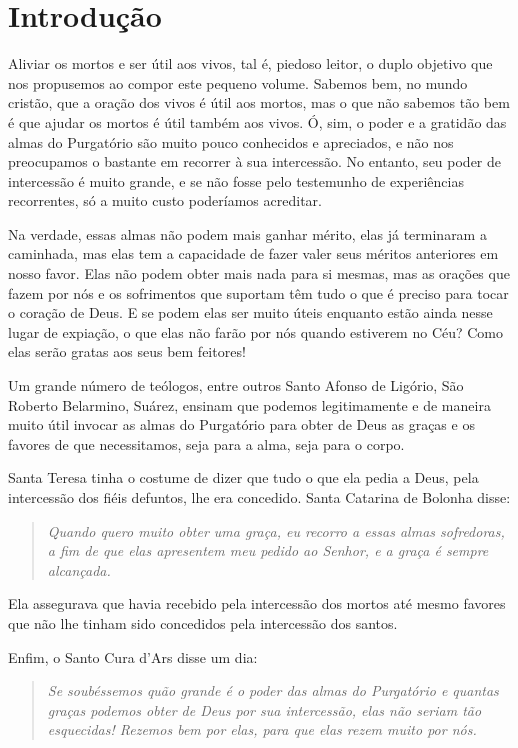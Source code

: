 \renewcommand{\thechapterdisplay}{Véspera do primeiro dia}
\renewcommand{\thechapterrunner}{Introdução}
\chapter[Véspera do primeiro dia --- Introdução]{Introdução}
Aliviar os mortos e ser útil aos vivos, tal é, piedoso leitor, o duplo objetivo que nos propusemos ao compor este pequeno volume. Sabemos bem, no mundo cristão, que a oração dos vivos é útil aos mortos, mas o que não sabemos tão bem é que ajudar os mortos é útil também aos vivos. Ó, sim, o poder e a gratidão das almas do Purgatório são muito pouco conhecidos e apreciados, e não nos preocupamos o bastante em recorrer à sua intercessão. No entanto, seu poder de intercessão é muito grande, e se não fosse pelo testemunho de experiências recorrentes, só a muito custo poderíamos acreditar. 

Na verdade, essas almas não podem mais ganhar mérito, elas já terminaram a caminhada, mas elas tem a capacidade de fazer valer seus méritos anteriores em nosso favor. Elas não podem obter mais nada para si mesmas, mas as orações que fazem por nós e os sofrimentos que suportam têm tudo o que é preciso para tocar o coração de Deus. E se podem elas ser muito úteis enquanto estão ainda nesse lugar de expiação, o que elas não farão por nós quando estiverem no Céu? Como elas serão gratas aos seus bem feitores! 

Um grande número de teólogos, entre outros Santo Afonso de Ligório, São Roberto Belarmino, Suárez, ensinam que podemos legitimamente e de maneira muito útil invocar as almas do Purgatório para obter de Deus as graças e os favores de que necessitamos, seja para a alma, seja para o corpo. 

Santa Teresa tinha o costume de dizer que tudo o que ela pedia a Deus, pela intercessão dos fiéis defuntos, lhe era concedido. Santa Catarina de Bolonha disse: 
\begin{quote}
\textit{\textit{Quando quero muito obter uma graça, eu recorro a essas almas sofredoras, a fim de que elas apresentem meu pedido ao Senhor, e a graça é sempre alcançada.}}
\end{quote}

Ela assegurava que havia recebido pela intercessão dos mortos até mesmo favores que não lhe tinham sido concedidos pela intercessão dos santos.

Enfim, o Santo Cura d'Ars disse um dia: 
\begin{quote}
\textit{\textit{Se soubéssemos quão grande é o poder das almas do Purgatório e quantas graças podemos obter de Deus por sua intercessão, elas não seriam tão esquecidas! Rezemos bem por elas, para que elas rezem muito por nós.}}
\end{quote}

